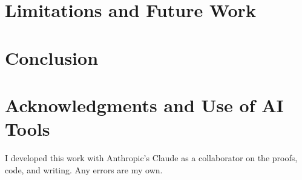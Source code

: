 \documentclass[11pt]{article}
\theoremstyle{definition}
\theoremstyle{remark}
\begin{document}
\section{Limitations and Future Work}
\label{sec:limitations}


\section{Conclusion}
\label{sec:conclusion}


\section*{Acknowledgments and Use of AI Tools}
I developed this work with Anthropic's Claude as a collaborator on the proofs, code, and
writing. Any errors are my own.



\end{document}
